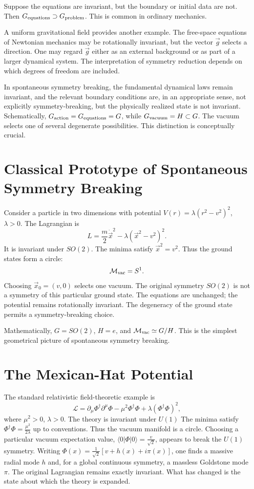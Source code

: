 Suppose the equations are invariant, but the boundary or initial data are not.
Then $G_{\rm equations}\supset G_{\rm problem}$.
This is common in ordinary mechanics.

A uniform gravitational field provides another example.  The free-space
equations of Newtonian mechanics may be rotationally invariant, but the vector
$\vec{g}$ selects a direction.
One may regard $\vec{g}$ either as an external background or as part of a
larger dynamical system.  The interpretation of symmetry reduction depends on
which degrees of freedom are included.

In spontaneous symmetry breaking, the fundamental dynamical laws remain
invariant, and the relevant boundary conditions are, in an appropriate sense,
not explicitly symmetry-breaking, but the physically realized state is not
invariant.
Schematically, $G_{\rm action}=G_{\rm equations}=G$, while
$G_{\rm vacuum}=H\subset G$.
The vacuum selects one of several degenerate possibilities.
This distinction is conceptually crucial.

\section{ Classical Prototype of Spontaneous Symmetry Breaking}
\label{sp:ssb1}

Consider a particle in two dimensions with potential
$V(r)=\lambda(r^2-v^2)^2$, $\lambda>0$.
The Lagrangian is
\[L= \frac{m}{2}\dot{\vec{x}}^2-\lambda(\vec{x}^2-v^2)^2.\]
It is invariant under $SO(2)$.
The minima satisfy $\vec{x}^2=v^2$.
Thus the ground states form a circle:
\[\mathcal{M}_{\rm vac}=S^1.\]
Choosing $\vec{x}_0=(v,0)$
selects one vacuum.
The original symmetry $SO(2)$ 
is not a symmetry of this particular ground state.
The equations are unchanged; the potential remains rotationally invariant.
The degeneracy of the ground state permits a symmetry-breaking choice.

Mathematically, $G=SO(2)$, $H={e}$, and $\mathcal{M}_{\rm vac}\simeq G/H$.
This is the simplest geometrical picture of spontaneous symmetry breaking.

\section{The Mexican-Hat Potential}
\label{sp:mh}

The standard relativistic field-theoretic example is
\[\mathcal{L}=\partial_\mu\Phi^\dagger\partial^\mu\Phi
-\mu^2\Phi^\dagger\Phi+\lambda(\Phi^\dagger\Phi)^2,\]
where $\mu^2>0$, $\lambda>0$.
The theory is invariant under $U(1)$
The minima satisfy $\Phi^\dagger\Phi=\tfrac{\mu^2}{2\lambda}$
up to conventions.
Thus the vacuum manifold is a circle.
Choosing a particular vacuum expectation value,
$\langle0|\Phi|0\rangle=\tfrac{v}{\sqrt2}$, appears to break the $U(1)$ 
symmetry. Writing $\Phi(x)=\tfrac{1}{\sqrt2}[v+h(x)+i\pi(x)]$,
one finds a massive radial mode $h$ and, for a global continuous symmetry, a
massless Goldstone mode $\pi$.
The original Lagrangian remains exactly invariant.  What has changed is the
state about which the theory is expanded.

